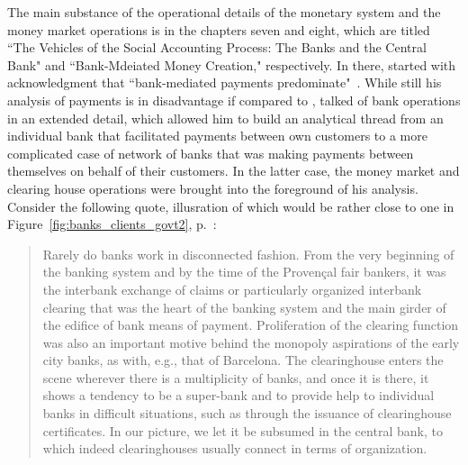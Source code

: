 The main substance of the operational details of the monetary system and the money market operations is in the chapters seven and eight, which are titled ``The Vehicles of the Social Accounting Process: The Banks and the Central Bank" and ``Bank-Mdeiated Money Creation," respectively. In there, \citeauthor{schumpeter2014} started with acknowledgment that ``bank-mediated payments predominate"~\citep[p.~156]{schumpeter2014}. While still his analysis of payments is in disadvantage if compared to \cite{innes1913}, \citeauthor{schumpeter2014} talked of bank operations in an extended detail, which allowed him to build an analytical thread from an individual bank that facilitated payments between own customers to a more complicated case of network of banks that was making payments between themselves on behalf of their customers. In the latter case, the money market and clearing house operations were brought into the foreground of his analysis. Consider the following quote, illusration of which would be rather close to one in Figure~\ref{fig:banks_clients_govt2}, p.~\pageref{fig:banks_clients_govt2}:

\begin{quote}
Rarely do banks work in disconnected fashion. From the very beginning
of the banking system and by the time of the Proven\c{c}al fair bankers, it was the
interbank exchange of claims or particularly organized interbank clearing that
was the heart of the banking system and the main girder of the edifice of bank
means of payment. Proliferation of the clearing function was also an important
motive behind the monopoly aspirations of the early city banks, as with, e.g.,
that of Barcelona. The clearinghouse enters the scene wherever there is a
multiplicity of banks, and once it is there, it shows a tendency to be a super-bank
and to provide help to individual banks in difficult situations, such as through the
issuance of clearinghouse certificates. In our picture, we let it be subsumed in
the central bank, to which indeed clearinghouses usually connect in terms of
organization.~\citep[p.~165]{schumpeter2014}
\end{quote}

